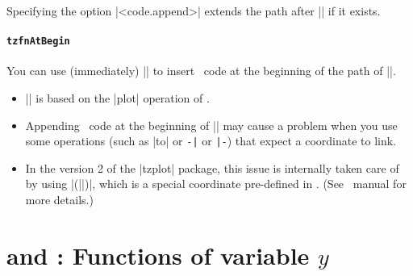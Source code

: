 Specifying the option |<code.append>| extends the path after |\tzfnEnd| if it exists.

\begin{tzcode}{.3}
\end{tzcode}


\paragraph{\texttt{\bs tzfnAtBegin}}
You can use \icmd{\tzfnAtBegin} (immediately)  |\tzfn| to insert \Tikz\ code at the beginning of the path of |\tzfn|.

\begin{tzcode}{.3}
\end{tzcode}




\remark
\begin{itemize}\firmlist
\item |\tzfn| is based on the |plot| operation of \Tikz.
\item Appending \Tikz\ code at the beginning of |\tzfn| may cause a problem when you use some operations (such as |to| or \verb+-|+ or \verb+|-+) that expect a coordinate to link.
\item In the version 2 of the |tzplot| package, this issue is internally taken care of by using
|(||)|, which is a special coordinate pre-defined in \Tikz. (See \Tikz\ manual for more details.)
\end{itemize}



\section{\protect\cmd{\tzfnofy} and \protect{}: Functions of variable $y$}
\label{ss:tzfnofy}

